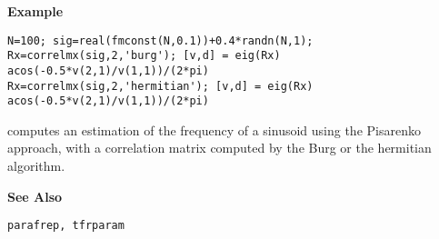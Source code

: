 \newpage
\vspace*{1cm}
{\bf \large {}\selectfont Example}\\
\hspace*{1.5cm}
\begin{minipage}[t]{13.5cm}

\begin{verbatim}
N=100; sig=real(fmconst(N,0.1))+0.4*randn(N,1); 
Rx=correlmx(sig,2,'burg'); [v,d] = eig(Rx)
acos(-0.5*v(2,1)/v(1,1))/(2*pi)
Rx=correlmx(sig,2,'hermitian'); [v,d] = eig(Rx)
acos(-0.5*v(2,1)/v(1,1))/(2*pi)
\end{verbatim}
computes an estimation of the frequency of a sinusoid using the Pisarenko
approach, with a correlation matrix computed by the Burg or the hermitian
algorithm.

\end{minipage}
\vspace*{.5cm}


{\bf \large {}\selectfont See Also}\\
\hspace*{1.5cm}
\begin{minipage}[t]{13.5cm}
\begin{verbatim}
parafrep, tfrparam
\end{verbatim}
\end{minipage}
